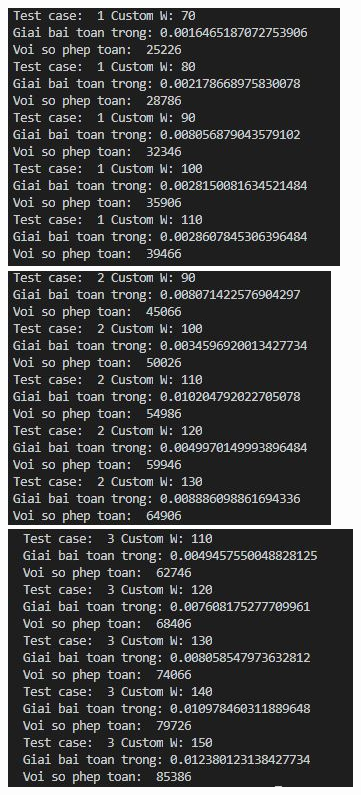 \documentclass[12pt,a4paper]{report}
\begin{document}
    \begin{center}
        \includegraphics{DPT1.JPG}
        \includegraphics{DPT2.JPG}
        \includegraphics{DPT3.JPG}
    \end{center}
\end{document}

